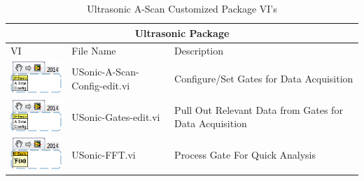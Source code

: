 \documentclass[letterpaper, twoside, openright]{report}
\begin{document}
\begin{table}
	\centering
	\begin{tabular}{ m{2.5cm} | m{5cm} | m{5cm} }
		\hline
		\hline \multicolumn{3}{c}{Ultrasonic Package} \\ \hline \hline
		VI & File Name & Description \\ \hline
		\includegraphics[scale=0.625]{USonic-A-Scan-Config-edit_main_01} & USonic-A-Scan-Config-edit.vi & Configure/Set Gates for Data Acquisition \\ \hline
		\includegraphics[scale=0.625]{USonic-A-Scan-Config-edit_main_01} & USonic-Gates-edit.vi & Pull Out Relevant Data from Gates for Data Acquisition \\ \hline
		\includegraphics[scale=0.625]{USonic-FFT_main_01} & USonic-FFT.vi & Process Gate For Quick Analysis \\ \hline
	\end{tabular}
	\caption{Ultrasonic A-Scan Customized Package VI's}
	\label{tab:3}
\end{table}
\end{document}
